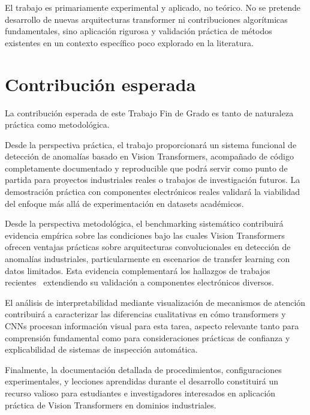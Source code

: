 El trabajo es primariamente experimental y aplicado, no teórico. No se pretende desarrollo de nuevas arquitecturas transformer ni contribuciones algorítmicas fundamentales, sino aplicación rigurosa y validación práctica de métodos existentes en un contexto específico poco explorado en la literatura.


\section{Contribución esperada}

La contribución esperada de este Trabajo Fin de Grado es tanto de naturaleza práctica como metodológica.

Desde la perspectiva práctica, el trabajo proporcionará un sistema funcional de detección de anomalías basado en Vision Transformers, acompañado de código completamente documentado y reproducible que podrá servir como punto de partida para proyectos industriales reales o trabajos de investigación futuros. La demostración práctica con componentes electrónicos reales validará la viabilidad del enfoque más allá de experimentación en datasets académicos.

Desde la perspectiva metodológica, el benchmarking sistemático contribuirá evidencia empírica sobre las condiciones bajo las cuales Vision Transformers ofrecen ventajas prácticas sobre arquitecturas convolucionales en detección de anomalías industriales, particularmente en escenarios de transfer learning con datos limitados. Esta evidencia complementará los hallazgos de trabajos recientes~\cite{huang2025semiconductor,zhang2025exploring,alber2024evaluating} extendiendo su validación a componentes electrónicos diversos.

El análisis de interpretabilidad mediante visualización de mecanismos de atención contribuirá a caracterizar las diferencias cualitativas en cómo transformers y CNNs procesan información visual para esta tarea, aspecto relevante tanto para comprensión fundamental como para consideraciones prácticas de confianza y explicabilidad de sistemas de inspección automática.

Finalmente, la documentación detallada de procedimientos, configuraciones experimentales, y lecciones aprendidas durante el desarrollo constituirá un recurso valioso para estudiantes e investigadores interesados en aplicación práctica de Vision Transformers en dominios industriales.